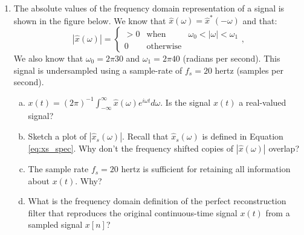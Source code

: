 \begin{enumerate}
  \item The absolute values of the frequency domain representation of a signal is shown 
        in the figure below. We know that $\hat{x}(\omega)=\hat{x}^*(-\omega)$ and that:
        \begin{equation}
          |\hat{x}(\omega)| = \left\{\begin{array}{ccc}
            >0 & \mathrm{when}      & \omega_0 <|\omega| < \omega_1 \\
            0  & \mathrm{otherwise} &
          \end{array}\right.,
        \end{equation}
        We also know that $\omega_0 = 2\pi 30$ and $\omega_1 = 2\pi40$ (radians per second). 
        This signal is undersampled using a sample-rate of $f_s=20$ hertz (samples per second).
        \begin{center}
        \end{center}
        \begin{enumerate}[a)]
          \item $x(t)=(2\pi)^{-1}\int_{-\infty}^{\infty}\hat{x}(\omega)e^{i\omega t}d\omega$. 
                Is the signal $x(t)$ a real-valued signal?
          \item Sketch a plot of $|\hat{x}_s(\omega)|$. Recall that $\hat{x}_s(\omega)$ is 
                defined in Equation \ref{eq:xs_spec}. Why don't the frequency shifted 
                copies of $|\hat{x}(\omega)|$ overlap?
          \item The sample rate $f_s=20$ hertz is sufficient for retaining all information 
                about $x(t)$. Why?
          \item What is the frequency domain definition of the perfect reconstruction filter that 
                reproduces the original continuous-time signal $x(t)$ from a sampled signal $x[n]$?
        \end{enumerate}

\end{enumerate}
